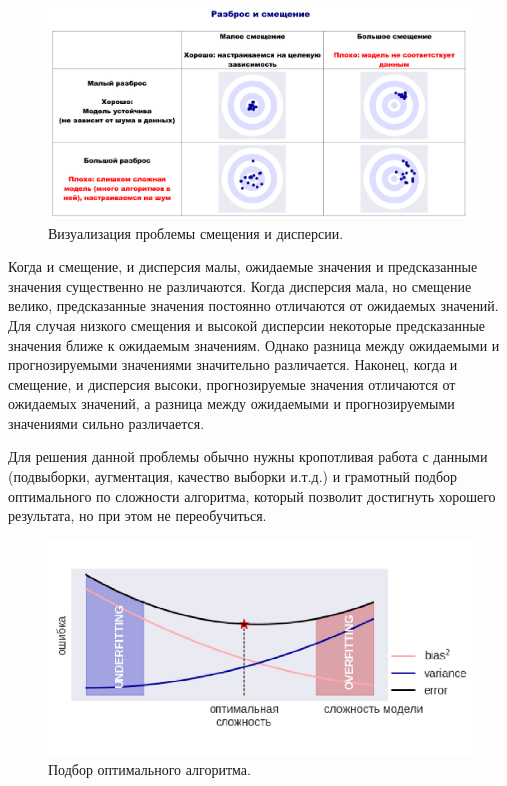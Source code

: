 \documentclass{article}
\begin{document}
\begin{figure}[H]
    \centering
    \includegraphics[scale=0.3]{desc_problem.png}
    \caption{Визуализация проблемы смещения и дисперсии.}
    \label{fig:my_label}
\end{figure}

Когда и смещение, и дисперсия малы, ожидаемые значения и предсказанные значения существенно не различаются. Когда дисперсия мала, но смещение велико, предсказанные значения постоянно отличаются от ожидаемых значений. Для случая низкого смещения и высокой дисперсии некоторые предсказанные значения ближе к ожидаемым значениям. Однако разница между ожидаемыми и прогнозируемыми значениями значительно различается. Наконец, когда и смещение, и дисперсия высоки, прогнозируемые значения отличаются от ожидаемых значений, а разница между ожидаемыми и прогнозируемыми значениями сильно различается. 

Для решения данной проблемы обычно нужны кропотливая работа с данными (подвыборки, аугментация, качество выборки и.т.д.) и грамотный подбор оптимального по сложности алгоритма, который позволит достигнуть хорошего результата, но при этом не переобучиться.

\begin{figure}[H]
    \centering
    \includegraphics[scale=0.55]{optimal_model.png}
    \caption{Подбор оптимального алгоритма.}
    \label{fig:my_label}
\end{figure}
\end{document}
